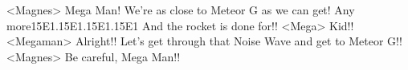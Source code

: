 <Magnes> Mega Man! We're as close to Meteor G as we can get! 
Any more{15}{E1}.{15}{E1}.{15}{E1}.{15}{E1} And the rocket is done for!! 
<Mega> Kid!! 
<Megaman> Alright!! 
Let's get through that Noise Wave and get to Meteor G!! 
<Magnes> Be careful, Mega Man!! 
